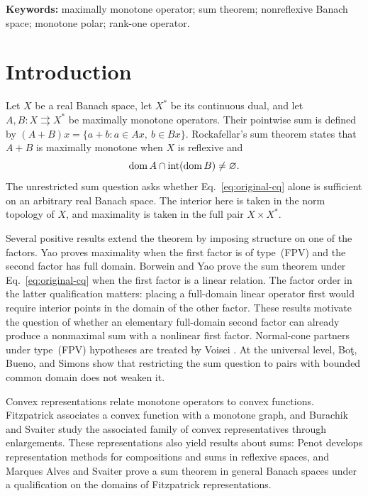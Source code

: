 \noindent\textbf{Keywords:} maximally monotone operator; sum theorem;
nonreflexive Banach space; monotone polar; rank-one operator.

\section{Introduction}
\label{sec:introduction}
Let $X$ be a real Banach space, let $X^*$ be its continuous dual, and let
$A,B:X\rightrightarrows X^*$ be maximally monotone operators. Their pointwise
sum is defined by $(A+B)x=\{a+b:a\in Ax,\ b\in Bx\}$. Rockafellar's sum
theorem \cite{rockafellar1970} states that $A+B$ is maximally monotone when
$X$ is reflexive and
\begin{equation}
\operatorname{dom} A\cap\operatorname{int}(\operatorname{dom} B)\ne\varnothing.
\label{eq:original-cq}
\end{equation}
The unrestricted sum question asks whether Eq.~\eqref{eq:original-cq}
alone is sufficient on an arbitrary real Banach space. The interior here
is taken in the norm topology of $X$, and maximality is taken in the full
pair $X\times X^*$.

Several positive results extend the theorem by imposing structure on one
of the factors. Yao \cite{yao2010} proves maximality when the first factor
is of type~(FPV) and the second factor has full domain. Borwein and Yao
\cite{borweinyao2012} prove the sum theorem under
Eq.~\eqref{eq:original-cq} when the first factor is a linear relation.
The factor order in the latter qualification matters: placing a
full-domain linear operator first would require interior points in the
domain of the other factor. These results motivate the question of
whether an elementary full-domain second factor can already produce a
nonmaximal sum with a nonlinear first factor.
Normal-cone partners under type~(FPV) hypotheses are treated by Voisei
\cite{voisei2010}. At the universal level, Bo\c{t}, Bueno, and Simons
\cite{botbuenosimons2016} show that restricting the sum question to pairs
with bounded common domain does not weaken it.

Convex representations relate monotone operators to convex functions.
Fitzpatrick \cite{fitzpatrick1988} associates a convex function with a
monotone graph, and Burachik and Svaiter \cite{burachiksvaiter2002}
study the associated family of convex representatives through enlargements.
These representations also yield results about sums: Penot
\cite{penot2004} develops representation methods for compositions and
sums in reflexive spaces, and Marques Alves and Svaiter
\cite{marquessvaiter2012} prove a sum theorem in general Banach spaces
under a qualification on the domains of Fitzpatrick representations.


